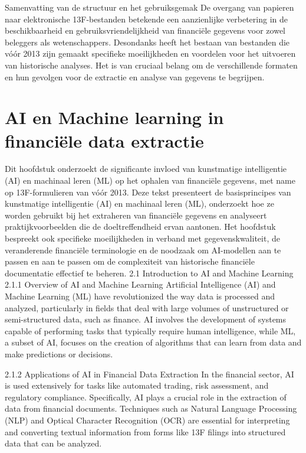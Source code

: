 Samenvatting van de structuur en het gebruiksgemak
De overgang van papieren naar elektronische 13F-bestanden betekende een aanzienlijke verbetering in de beschikbaarheid en gebruiksvriendelijkheid van financiële gegevens voor zowel beleggers als wetenschappers. Desondanks heeft het bestaan van bestanden die vóór 2013 zijn gemaakt specifieke moeilijkheden en voordelen voor het uitvoeren van historische analyses. Het is van cruciaal belang om de verschillende formaten en hun gevolgen voor de extractie en analyse van gegevens te begrijpen.






\section{AI en Machine learning in financiële data extractie}
Dit hoofdstuk onderzoekt de significante invloed van kunstmatige intelligentie (AI) en machinaal leren (ML) op het ophalen van financiële gegevens, met name op 13F-formulieren van vóór 2013. Deze tekst presenteert de basisprincipes van kunstmatige intelligentie (AI) en machinaal leren (ML), onderzoekt hoe ze worden gebruikt bij het extraheren van financiële gegevens en analyseert praktijkvoorbeelden die de doeltreffendheid ervan aantonen. Het hoofdstuk bespreekt ook specifieke moeilijkheden in verband met gegevenskwaliteit, de veranderende financiële terminologie en de noodzaak om AI-modellen aan te passen en aan te passen om de complexiteit van historische financiële documentatie effectief te beheren.
2.1 Introduction to AI and Machine Learning
2.1.1 Overview of AI and Machine Learning
Artificial Intelligence (AI) and Machine Learning (ML) have revolutionized the way data is processed and analyzed, particularly in fields that deal with large volumes of unstructured or semi-structured data, such as finance. AI involves the development of systems capable of performing tasks that typically require human intelligence, while ML, a subset of AI, focuses on the creation of algorithms that can learn from data and make predictions or decisions.

2.1.2 Applications of AI in Financial Data Extraction
In the financial sector, AI is used extensively for tasks like automated trading, risk assessment, and regulatory compliance. Specifically, AI plays a crucial role in the extraction of data from financial documents. Techniques such as Natural Language Processing (NLP) and Optical Character Recognition (OCR) are essential for interpreting and converting textual information from forms like 13F filings into structured data that can be analyzed.

